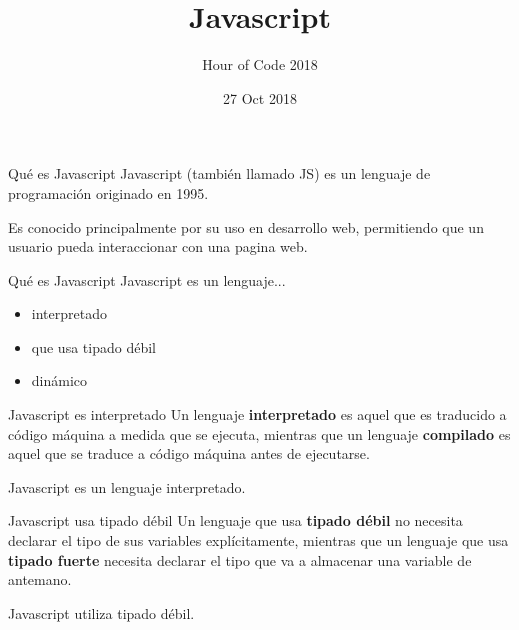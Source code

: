 \documentclass{beamer}
\title{Javascript}
\subtitle{Hour of Code 2018}
\institute{Universidad de Valladolid}
\date{27 Oct 2018}
\begin{document}
\begin{frame}
        \maketitle
\end{frame}
    \setlength{\parskip}{\baselineskip}%
    \setlength{\parindent}{0pt}%

\begin{frame}{Qué es Javascript}
    	\pause
        Javascript (también llamado JS) es un lenguaje de programación originado en 1995.\pause

    	Es conocido principalmente por su uso en desarrollo web, permitiendo que un usuario pueda interaccionar con una pagina web.
\end{frame}
\begin{frame}{Qué es Javascript}
        Javascript es un lenguaje... \bigskip
        \begin{itemize}
            \item interpretado\pause
            \item que usa tipado débil\pause
            \item dinámico
    \end{itemize}
\end{frame}
    
\begin{frame}{Javascript es interpretado}
        \pause
        Un lenguaje \textbf{interpretado} es aquel que es traducido a código máquina a medida que se ejecuta, mientras que un lenguaje \textbf{compilado} es aquel que se traduce a código máquina antes de ejecutarse.\pause
        \centering
        
        Javascript es un lenguaje interpretado.
\end{frame}
    
\begin{frame}{Javascript usa tipado débil}
        \pause
        Un lenguaje que usa \textbf{tipado débil} no necesita declarar el tipo de sus variables explícitamente, mientras que un lenguaje que usa \textbf{tipado fuerte} necesita declarar el tipo que va a almacenar una variable de antemano.\pause
        \centering
        
        Javascript utiliza tipado débil.
\end{frame}
    
\end{document}
